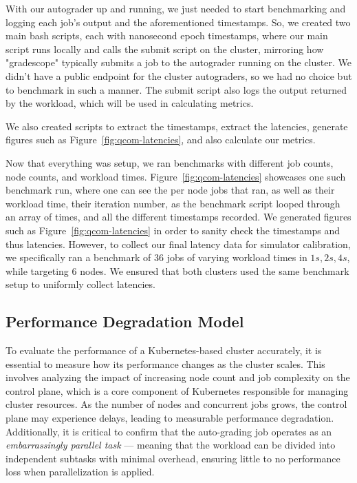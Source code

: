 \documentclass[acmlarge]{acmart}
\begin{document}
With our autograder up and running, we just needed to start benchmarking and logging each job's output and the aforementioned timestamps. So, we created two main bash scripts, each with nanosecond epoch timestamps, where our main script runs locally and calls the submit script on the cluster, mirroring how "gradescope" typically submits a job to the autograder running on the cluster. We didn't have a public endpoint for the cluster autograders, so we had no choice but to benchmark in such a manner. The submit script also logs the output returned by the workload, which will be used in calculating metrics.

We also created scripts to extract the timestamps, extract the latencies, generate figures such as Figure~\ref{fig:qcom-latencies}, and also calculate our metrics.

Now that everything was setup, we ran benchmarks with different job counts, node counts, and workload times. Figure~\ref{fig:qcom-latencies} showcases one such benchmark run, where one can see the per node jobs that ran, as well as their workload time, their iteration number, as the benchmark script looped through an array of times, and all the different timestamps recorded. We generated figures such as Figure~\ref{fig:qcom-latencies} in order to sanity check the timestamps and thus latencies. However, to collect our final latency data for simulator calibration, we specifically ran a benchmark of $36$ jobs of varying workload times in ${1s, 2s, 4s}$, while targeting $6$ nodes. We ensured that both clusters used the same benchmark setup to uniformly collect latencies.

\subsection{Performance Degradation Model}

To evaluate the performance of a Kubernetes-based cluster accurately, it is essential to measure how its performance changes as the cluster scales. This involves analyzing the impact of increasing node count and job complexity on the control plane, which is a core component of Kubernetes responsible for managing cluster resources. As the number of nodes and concurrent jobs grows, the control plane may experience delays, leading to measurable performance degradation. Additionally, it is critical to confirm that the auto-grading job operates as an \textit{embarrassingly parallel task} — meaning that the workload can be divided into independent subtasks with minimal overhead, ensuring little to no performance loss when parallelization is applied.
\end{document}
